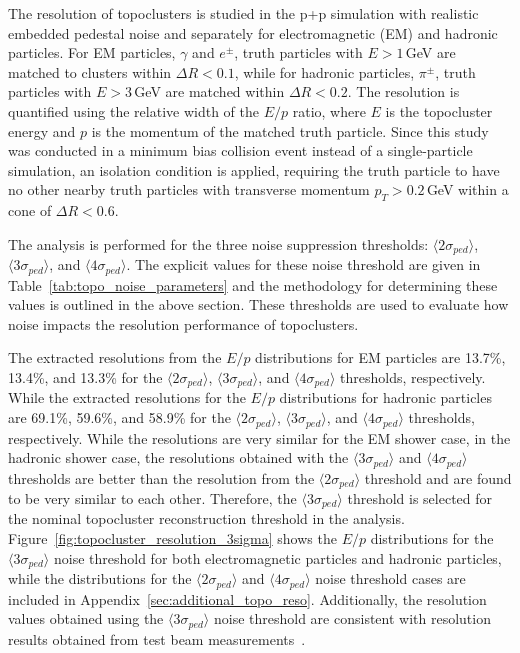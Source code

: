 The resolution of topoclusters is studied in the \pythia p+p simulation with realistic embedded pedestal noise and separately for electromagnetic (EM) and hadronic particles. For EM particles, $\gamma$ and $e^{\pm}$, truth particles with $E>1$\,GeV are matched to clusters within $\Delta R<0.1$, while for hadronic particles, $\pi^{\pm}$, truth particles with $E>3$\,GeV are matched within $\Delta R<0.2$. 
The resolution is quantified using the relative width of the $E/p$ ratio, where $E$ is the topocluster energy and $p$ is the momentum of the matched truth particle.  
Since this study was conducted in a minimum bias collision event instead of a single-particle simulation, an isolation condition is applied, requiring the truth particle to have no other nearby truth particles with transverse momentum $p_T > 0.2$\,GeV within a cone of $\Delta R < 0.6$. 

The analysis is performed for the three noise suppression thresholds: $\langle2\sigma_{ped}\rangle$, $\langle3\sigma_{ped}\rangle$, and $\langle4\sigma_{ped}\rangle$. The explicit values for these noise threshold are given in Table~\ref{tab:topo_noise_parameters} and the methodology for determining these values is outlined in the above section. These thresholds are used to evaluate how noise impacts the resolution performance of topoclusters.

The extracted resolutions from the $E/p$ distributions for EM particles are 13.7\%, 13.4\%, and 13.3\% for the $\langle2\sigma_{ped}\rangle$, $\langle3\sigma_{ped}\rangle$, and $\langle4\sigma_{ped}\rangle$ thresholds, respectively. 
While the extracted resolutions for the $E/p$ distributions for hadronic particles are 69.1\%, 59.6\%, and 58.9\% for the $\langle2\sigma_{ped}\rangle$, $\langle3\sigma_{ped}\rangle$, and $\langle4\sigma_{ped}\rangle$ thresholds, respectively.  
While the resolutions are very similar for the EM shower case, in the hadronic shower case, the resolutions obtained with the $\langle3\sigma_{ped}\rangle$ and $\langle4\sigma_{ped}\rangle$ thresholds are better than the resolution from the $\langle2\sigma_{ped}\rangle$ threshold and are found to be very similar to each other. 
Therefore, the $\langle3\sigma_{ped}\rangle$ threshold is selected for the nominal topocluster reconstruction threshold in the analysis.
Figure~\ref{fig:topocluster_resolution_3sigma} shows the $E/p$ distributions for the $\langle3\sigma_{ped}\rangle$ noise threshold for both electromagnetic particles and hadronic particles, while the distributions for the $\langle2\sigma_{ped}\rangle$ and $\langle4\sigma_{ped}\rangle$ noise threshold cases are included in Appendix~\ref{sec:additional_topo_reso}. 
Additionally, the resolution values obtained using the $\langle3\sigma_{ped}\rangle$ noise threshold  are consistent with resolution results obtained from test beam measurements~\cite{emcal_beamtest,emcal_hcal_beamtest}. 

